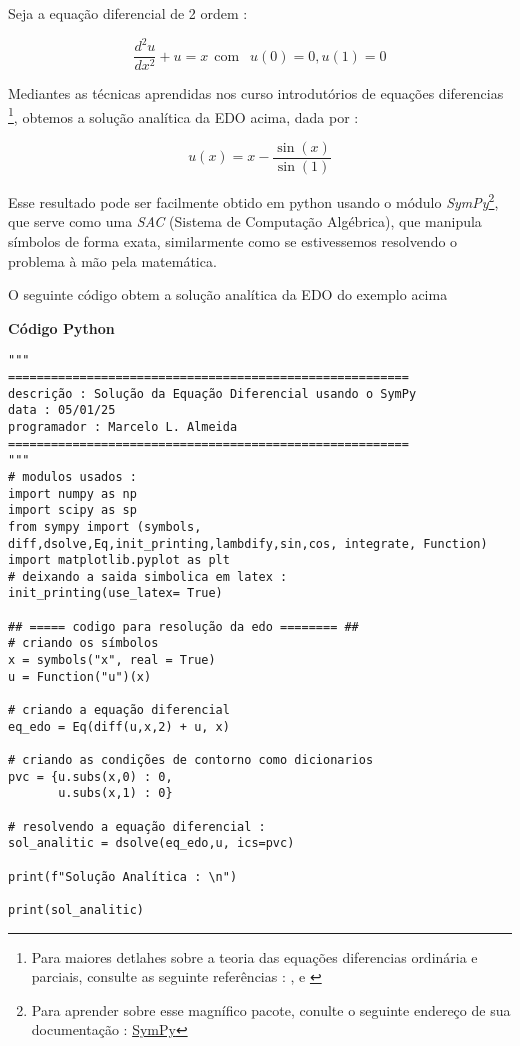 \documentclass[a4paper, 12pt]{article}
\numberwithin{equation}{section}
\begin{document}
Seja a equação diferencial de 2 ordem : 

$$\dfrac{d^2u}{dx^2} + u = x   \ \ \textrm{com } \ \ u(0) = 0, u(1) = 0$$

Mediantes as técnicas aprendidas nos curso introdutórios de equações diferencias \footnote{Para maiores detlahes sobre a teoria das equações diferencias ordinária e parciais, consulte as seguinte referências : \citep{zill2016equaccoes}, \citep{boyce2010equaccoes} e \citep{kreyszig2009matematica}}, obtemos a solução analítica da EDO acima, dada por : 

\begin{equation*}
    u(x) = x - \frac{\sin(x)}{\sin(1)}   \label{sol_anal1}
\end{equation*}

Esse resultado pode ser facilmente obtido em python usando o módulo \textit{SymPy}\footnote{Para aprender sobre esse magnífico pacote, conulte o seguinte endereço de sua documentação : \href{https://docs.sympy.org/latest/index.html}{SymPy}}, que serve como uma \textit{SAC} (Sistema de Computação Algébrica), que manipula símbolos de forma exata, similarmente como se estivessemos resolvendo o problema à mão pela matemática.

O seguinte código obtem a solução analítica da EDO do exemplo acima 

\vspace{1cm}

{\textbf{\large Código Python}}


\begin{lstlisting}
"""
========================================================
descrição : Solução da Equação Diferencial usando o SymPy
data : 05/01/25
programador : Marcelo L. Almeida 
========================================================
"""
# modulos usados :
import numpy as np 
import scipy as sp 
from sympy import (symbols, diff,dsolve,Eq,init_printing,lambdify,sin,cos, integrate, Function)
import matplotlib.pyplot as plt 
# deixando a saida simbolica em latex : 
init_printing(use_latex= True)

## ===== codigo para resolução da edo ======== ## 
# criando os símbolos 
x = symbols("x", real = True)
u = Function("u")(x)

# criando a equação diferencial 
eq_edo = Eq(diff(u,x,2) + u, x)

# criando as condições de contorno como dicionarios 
pvc = {u.subs(x,0) : 0, 
       u.subs(x,1) : 0}

# resolvendo a equação diferencial :
sol_analitic = dsolve(eq_edo,u, ics=pvc)

print(f"Solução Analítica : \n")

print(sol_analitic)
\end{lstlisting}
\end{document}
